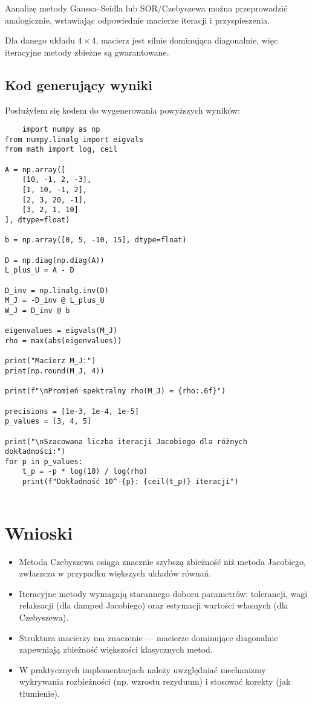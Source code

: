 \documentclass[a4paper,12pt]{article}
\begin{document}
\bigskip

\noindent
Aanalizę metody Gaussa–Seidla lub SOR/Czebyszewa można przeprowadzić analogicznie, wstawiając odpowiednie macierze iteracji i przyspieszenia.

Dla danego układu \(4 \times 4\), macierz jest silnie dominująca diagonalnie, więc iteracyjne metody zbieżne są gwarantowane.

\subsection{Kod generujący wyniki}

Posłużyłem się kodem do wygenerowania powyższych wyników:

\begin{lstlisting}
    import numpy as np
from numpy.linalg import eigvals
from math import log, ceil

A = np.array([
    [10, -1, 2, -3],
    [1, 10, -1, 2],
    [2, 3, 20, -1],
    [3, 2, 1, 10]
], dtype=float)

b = np.array([0, 5, -10, 15], dtype=float)

D = np.diag(np.diag(A))
L_plus_U = A - D

D_inv = np.linalg.inv(D)
M_J = -D_inv @ L_plus_U
W_J = D_inv @ b

eigenvalues = eigvals(M_J)
rho = max(abs(eigenvalues))

print("Macierz M_J:")
print(np.round(M_J, 4))

print(f"\nPromień spektralny rho(M_J) = {rho:.6f}")

precisions = [1e-3, 1e-4, 1e-5]
p_values = [3, 4, 5]

print("\nSzacowana liczba iteracji Jacobiego dla różnych dokładności:")
for p in p_values:
    t_p = -p * log(10) / log(rho)
    print(f"Dokładność 10^-{p}: {ceil(t_p)} iteracji")


\end{lstlisting}


\section*{Wnioski}

\begin{itemize}
  \item Metoda Czebyszewa osiąga znacznie szybszą zbieżność niż metoda Jacobiego, zwłaszcza w przypadku większych układów równań.
  \item Iteracyjne metody wymagają starannego doboru parametrów: tolerancji, wagi relaksacji (dla damped Jacobiego) oraz estymacji wartości własnych (dla Czebyszewa).
  \item Struktura macierzy ma znaczenie — macierze dominujące diagonalnie zapewniają zbieżność większości klasycznych metod.
  \item W praktycznych implementacjach należy uwzględniać mechanizmy wykrywania rozbieżności (np. wzrostu rezyduum) i stosować korekty (jak tłumienie).
\end{itemize}




\end{document}
